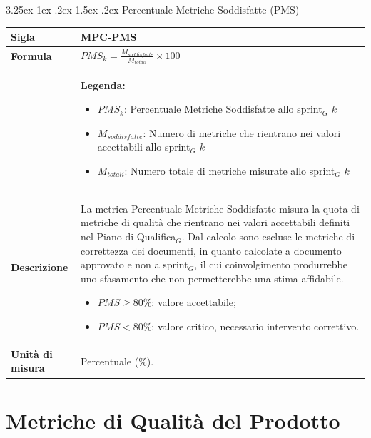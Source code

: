 \documentclass[a4paper, 10pt]{article}
\makeatletter
\renewcommand\paragraph{\@startsection{paragraph}{4}{\z@}%
  {3.25ex \@plus1ex \@minus .2ex}%
  {1.5ex \@plus .2ex}%
  {\normalfont\normalsize\bfseries}}
\makeatother
\begin{document}
\paragraph{Percentuale Metriche Soddisfatte (PMS)}
\mbox{} \\
\noindent
\begin{minipage}{\textwidth}
    \begin{tabularx}{\textwidth}{|>{\columncolor{bluBitless!10}\bfseries}p{3.5cm}|X|}
        \hline
        Sigla & MPC-PMS \\ \hline
        Formula &
        \textit{$PMS_{k} = \frac{M_{soddisfatte}}{M_{totali}} \times 100$} \vspace{2mm} \\
        & \small \textbf{Legenda:}
        \begin{itemize}
            \item $PMS_{k}$: Percentuale Metriche Soddisfatte allo sprint$_G$ $k$
            \item $M_{soddisfatte}$: Numero di metriche che rientrano nei valori accettabili allo sprint$_G$ $k$
            \item $M_{totali}$: Numero totale di metriche misurate allo sprint$_G$ $k$
        \end{itemize} \\ \hline
        Descrizione & La metrica Percentuale Metriche Soddisfatte misura la quota di metriche di qualità che rientrano nei valori accettabili definiti nel Piano di Qualifica$_G$. Dal calcolo sono escluse le metriche di correttezza dei documenti, in quanto calcolate a documento approvato e non a sprint$_G$, il cui coinvolgimento produrrebbe uno sfasamento che non permetterebbe una stima affidabile.
        \begin{itemize}
            \item $PMS \geq 80\%$: valore accettabile;
            \item $PMS < 80\%$: valore critico, necessario intervento correttivo.
        \end{itemize} \\ \hline
        Unità di misura & Percentuale (\%). \\ \hline
    \end{tabularx}
\end{minipage}

\section{Metriche di Qualità del Prodotto}
\end{document}

